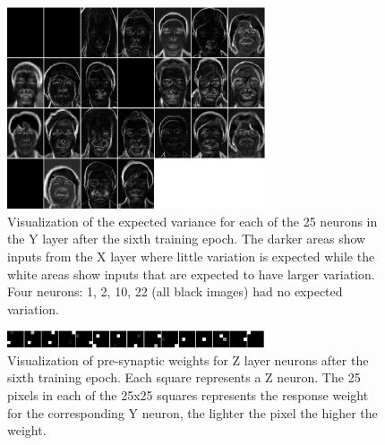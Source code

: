 \documentclass[conference]{IEEEtran}
\begin{document}
\begin{figure}
\center
\includegraphics[width=3in]{figs/epoch_5_0_sigmas}
\caption{Visualization of the expected variance for each of the 25 neurons in the Y layer after the sixth training epoch.  The darker areas show inputs from the X layer where little variation is expected while the white areas show inputs that are expected to have larger variation.  Four neurons: 1, 2, 10, 22 (all black images) had no expected variation.}
\label{fig:y_sigmas}
\end{figure}

\begin{figure}
\center
\includegraphics[width=3in]{figs/epoch_5_0_yz}
\caption{Visualization of pre-synaptic weights for Z layer neurons after the sixth training epoch.  Each square represents a Z neuron.  The 25 pixels in each of the 25x25 squares represents the response weight for the corresponding Y neuron, the lighter the pixel the higher the weight.}
\label{fig:z_weights}
\end{figure}
\end{document}
